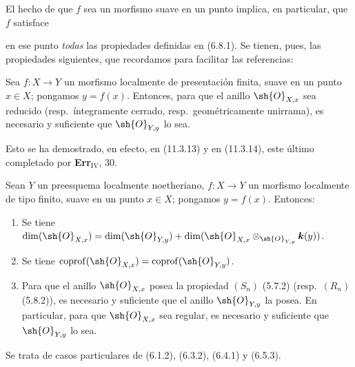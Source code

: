 El hecho de que $f$ sea un morfismo suave en un punto implica, en particular, que $f$ satisface

en ese punto \emph{todas} las propiedades definidas en (6.8.1). Se tienen, pues, las propiedades siguientes, que recordamos para facilitar las referencias:

\begin{proposition}[17.5.7]
\label{IV.17.5.7}
Sea $f:X\to Y$ un morfismo localmente de presentación finita, suave en un punto $x\in X$; pongamos $y=f(x)$. Entonces, para que el anillo $\sh{O}_{X,x}$ sea reducido \textup{(resp.}\ íntegramente cerrado, \textup{resp.}\ geométricamente unirrama\textup{)}, es necesario y suficiente que $\sh{O}_{Y,y}$ lo sea.
\end{proposition}

Esto se ha demostrado, en efecto, en (11.3.13) y en (11.3.14), este último completado por \textbf{Err}$_{\mathrm{IV}}$, 30.

\begin{proposition}[17.5.8]
\label{IV.17.5.8}
Sean $Y$ un preesquema localmente noetheriano, $f:X\to Y$ un morfismo localmente de tipo finito, suave en un punto $x\in X$; pongamos $y=f(x)$. Entonces:
\begin{enumerate}
  \item[\textup{(i)}] Se tiene $\dim(\sh{O}_{X,x})=\dim(\sh{O}_{Y,y})+\dim(\sh{O}_{X,x}\otimes_{\sh{O}_{Y,y}}\boldsymbol{k}(y))$.
  \item[\textup{(ii)}] Se tiene $\operatorname{coprof}(\sh{O}_{X,x})=\operatorname{coprof}(\sh{O}_{Y,y})$.
  \item[\textup{(iii)}] Para que el anillo $\sh{O}_{X,x}$ posea la propiedad $(S_n)$ \textup{(5.7.2) (resp.}\ $(R_n)$ \textup{(5.8.2))}, es necesario y suficiente que el anillo $\sh{O}_{Y,y}$ la posea. En particular, para que $\sh{O}_{X,x}$ sea regular, es necesario y suficiente que $\sh{O}_{Y,y}$ lo sea.
\end{enumerate}
\end{proposition}

Se trata de casos particulares de (6.1.2), (6.3.2), (6.4.1) y (6.5.3).
